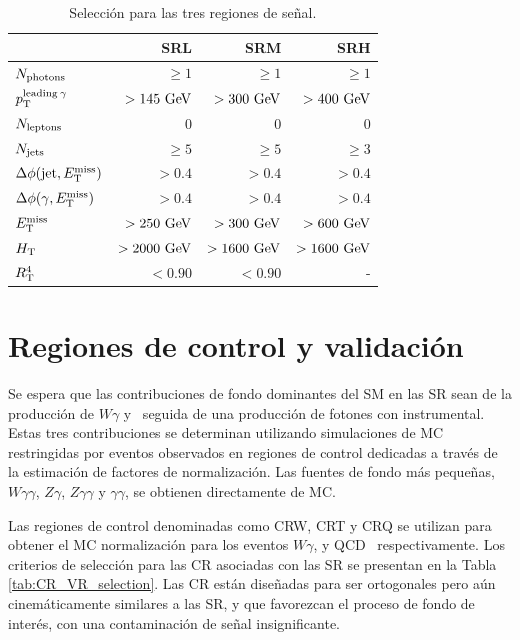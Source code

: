 \begin{table}[ht!]
  \centering
  \begin{tabular}{lrrr}
    \hline
    \hline
                                                    &        SRL    &       SRM     &         SRH \\
      \hline
      $N_{\text{photons}}$                        &        $\ge1$ &        $\ge1$ &        $\ge1$ \\
      $p_{\text{T}}^{\text{leading}\: \gamma}$                 &  $>145\ \gev$ &  $>300\ \gev$ &  $>400\ \gev$ \\
      $N_{\text{leptons}}$                        &             0 &             0 &             0 \\
      $N_{\text{jets}}$                           &       $\ge 5$ &       $\ge 5$ &       $\ge 3$ \\
      $\Delta\phi(\text{jet}, E_{\text{T}}^{\text{miss}})$                &        $>0.4$ &        $>0.4$ &        $>0.4$ \\
      $\Delta\phi(\gamma, E_{\text{T}}^{\text{miss}})$                    &        $>0.4$ &        $>0.4$ &        $>0.4$ \\
      $E_{\text{T}}^{\text{miss}}$                                       &  $>250\ \gev$ &  $>300\ \gev$ &  $>600\ \gev$ \\
      $H_{\text{T}}$                                         & $>2000\ \gev$ & $>1600\ \gev$ & $>1600\ \gev$ \\
      $R_{\text{T}}^{4}$                            &       $<0.90$ &       $<0.90$ &             - \\
      \hline
      \hline
    \end{tabular}
  \caption{Selección para las tres regiones de señal.}
  \label{tab:sr_selection}
\end{table}



\section{Regiones de control y validación}

Se espera que las contribuciones de fondo dominantes del SM en las SR sean de la
producción de $W \gamma$ y \ttbarph\, seguida de una producción de fotones con \met instrumental. Estas tres contribuciones se determinan utilizando simulaciones de MC restringidas por eventos observados en regiones de control dedicadas a través de la estimación de factores de normalización. Las fuentes de fondo más pequeñas,
$ W \gamma \gamma $, $ Z \gamma $, $ Z \gamma \gamma $ y $ \gamma \gamma $, se obtienen
directamente de MC.

Las regiones de control denominadas como CRW, CRT y CRQ se utilizan para obtener el MC
normalización para los eventos $ W \gamma $, \ttbarph y QCD \phj\, respectivamente.
Los criterios de selección para las CR asociadas con las SR se presentan en la Tabla \ref{tab:CR_VR_selection}. Las CR están diseñadas para ser ortogonales pero aún cinemáticamente similares a las SR, y que favorezcan el proceso de fondo de interés, con una contaminación de señal insignificante.

